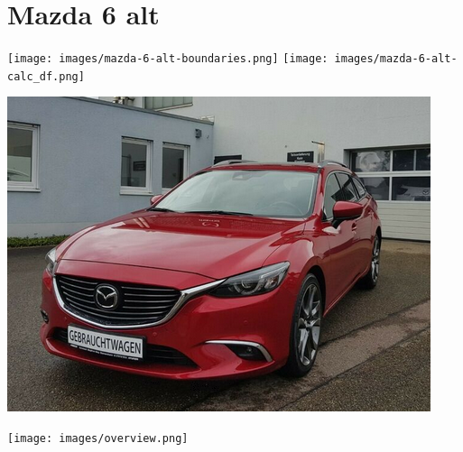 \documentclass[landscape, DIV=99, 14pt]{scrartcl}
\begin{document}
\pagebreak


\twocolumn

\section*{Mazda 6 alt}
\begin{center}
\texttt{[image: images/mazda-6-alt-boundaries.png]}
\null
\vspace{0.5cm}
\texttt{[image: images/mazda-6-alt-calc\_df.png]}
\end{center}

\pagebreak
\null
\vspace{2cm}
\begin{center}
\includegraphics[width=0.9\columnwidth]{cars/mazda-6-alt.png}
\end{center}

\pagebreak



\pagebreak

\onecolumn
\null
\vfill 
\begin{center}
\texttt{[image: images/overview.png]}
\end{center}
\vfill 
\end{document}
